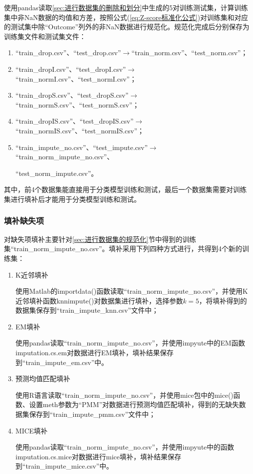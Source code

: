 \documentclass[a4paper]{ctexart}
\begin{document}
使用pandas读取\ref{sec:进行数据集的删除和划分}中生成的5对训练测试集，计算训练集中非NaN数据的均值和方差，按照公式(\ref{eq:Z-score标准化公式})对训练集和对应的测试集中除“Outcome”列外的非NaN数据进行规范化。规范化完成后分别保存为训练集文件和测试集文件：
\begin{enumerate}
	\item “train\_drop.csv”、“test\_drop.csv”$\rightarrow$“train\_norm.csv”、“test\_norm.csv”；
	\item “train\_dropI.csv”、“test\_dropI.csv”$\rightarrow$“train\_normI.csv”、“test\_normI.csv”；
	\item “train\_dropS.csv”、“test\_dropS.csv”$\rightarrow$“train\_normS.csv”、“test\_normS.csv”；
	\item “train\_dropIS.csv”、“test\_dropIS.csv”$\rightarrow$“train\_normIS.csv”、“test\_normIS.csv”；
	\item “train\_impute\_no.csv”、“test\_impute.csv”$\rightarrow$“train\_norm\_impute\_no.csv”、

	      “test\_norm\_impute.csv”。
\end{enumerate}
其中，前4个数据集能直接用于分类模型训练和测试，最后一个数据集需要对训练集进行填补后才能用于分类模型训练和测试。

\subsubsection{填补缺失项}\label{sec:填补缺失项}
对缺失项填补主要针对\ref{sec:进行数据集的规范化}节中得到的训练集“train\_norm\_impute\_no.csv”。填补采用下列四种方式进行，共得到4个新的训练集：
\begin{enumerate}

	\item K近邻填补

	      使用Matlab的importdata()函数读取“train\_norm\_impute\_no.csv”，并使用K近邻填补函数knnimpute()对数据集进行填补，选择参数$k=5$，将填补得到的数据集保存到“train\_impute\_knn.csv”文件中；

	\item EM填补

	      使用pandas读取“train\_norm\_impute\_no.csv”，并使用impyute中的EM函数imputation.cs.em对数据进行EM填补，填补结果保存到“train\_impute\_em.csv”中。

	\item 预测均值匹配填补

	      使用R语言读取“train\_norm\_impute\_no.csv”，并使用mice包中的mice()函数、设置meth参数为“PMM”对数据进行预测均值匹配填补，得到的无缺失数据集保存到“train\_impute\_pmm.csv”文件中；

	\item MICE填补

	      使用pandas读取“train\_norm\_impute\_no.csv”，并使用impyute中的函数imputation.cs.mice对数据进行mice填补，填补结果保存到“train\_impute\_mice.csv”中。

\end{enumerate}
\end{document}
